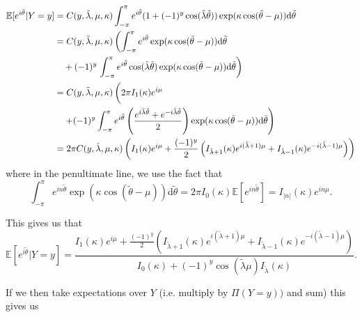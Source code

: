 \documentclass[]{report}
\begin{document}
\begin{align*}
	\mathbb{E}[e^{i \tilde{\theta}} | Y = y] &= C(y, \tilde{\lambda},\mu, \kappa) \int_{- \pi}^{\pi} e^{i \tilde{\theta}} (1 + (-1)^y \cos(\tilde{\lambda} \tilde{\theta})) \exp(\kappa \cos(\tilde{\theta} - \mu)) \text{d} \tilde{\theta} \\
& =	C(y, \tilde{\lambda},\mu, \kappa) \left(  \int_{- \pi}^{\pi} e^{i \tilde{\theta}} \exp(\kappa \cos(\tilde{\theta} - \mu)) \text{d} \tilde{\theta} \right. \\
 & \quad + (-1)^y  \left. \int_{- \pi}^{\pi} e^{i \tilde{\theta}} \cos(\tilde{\lambda} \tilde{\theta})   \exp(\kappa \cos(\tilde{\theta} - \mu)) \text{d} \tilde{\theta} \right)\\
 &= C(y, \tilde{\lambda},\mu, \kappa) \left( \vphantom{\int_{-\pi}^\pi} 2 \pi I_1(\kappa) e^{i \mu} \right. \\
 &\quad \left.+ (-1)^y  \int_{-\pi}^{\pi} e^{i \tilde{\theta}} \left( \frac{e^{i \tilde{\lambda} \tilde{\theta}} + e^{- i \tilde{\lambda} \tilde{\theta}}}{2}\right)  \exp(\kappa \cos(\tilde{\theta} - \mu)) \text{d} \tilde{\theta} \right) \\
 &= 2 \pi C(y, \tilde{\lambda},\mu, \kappa) \left( I_1(\kappa) e^{i \mu} + \frac{(-1)^y}{2} \left(I_{\tilde{\lambda} + 1}(\kappa)e^{i(\tilde{\lambda} + 1) \mu}  + I_{\tilde{\lambda} - 1}(\kappa) e^{-i(\tilde{\lambda} - 1)\mu}\right) \right)
\end{align*}
where in the penultimate line, we use the fact that
\[
\int_{- \pi}^ \pi e^{i n \tilde{\theta}} \exp(\kappa \cos(\tilde{\theta} - \mu)) \text{d} \tilde{\theta} = 2 \pi I_0(\kappa) \mathbb{E}[e^{i n \tilde{\theta}}] = I_{|n|}(\kappa) e^{i n \mu}.
\]

This gives us that
\[
\mathbb{E}[e^{i \tilde{\theta}} | Y = y] = \frac{ I_1(\kappa) e^{i \mu} + \frac{(-1)^y}{2} \left(I_{\tilde{\lambda} + 1}(\kappa)e^{i(\tilde{\lambda} + 1) \mu}  + I_{\tilde{\lambda} - 1}(\kappa) e^{-i(\tilde{\lambda} - 1)\mu}\right)}{I_0(\kappa) + (-1)^y \cos(\tilde{\lambda} \mu) I_{\tilde{\lambda}}(\kappa)}.
\]

If we then take expectations over $Y$ (i.e. multiply by $\Pi(Y = y))$ and sum) this gives us
\end{document}
